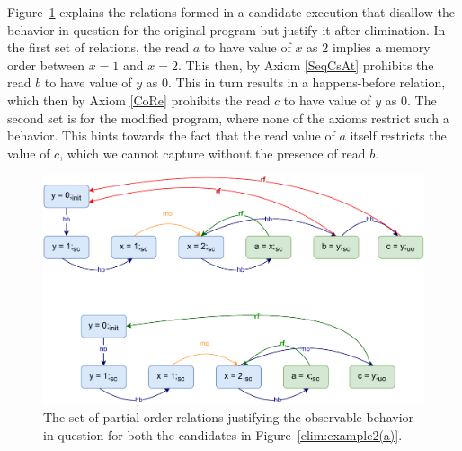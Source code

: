     Figure~\ref{elim:example2(b)} explains the relations formed in a candidate execution that disallow the behavior in question for the original program but justify it after elimination. 
    In the first set of relations, the read $a$ to have value of $x$ as $2$ implies a memory order between $x=1$ and $x=2$. 
    This then, by Axiom \ref{SeqCsAt} prohibits the read $b$ to have value of $y$ as $0$.
    This in turn results in a happens-before relation, which then by Axiom \ref{CoRe} prohibits the read $c$ to have value of $y$ as $0$.
    The second set is for the modified program, where none of the axioms restrict such a behavior\footnotemark. 
    This hints towards the fact that the read value of $a$ itself restricts the value of $c$, which we cannot capture without the presence of read $b$.
    \begin{figure}[H]
        \centering
        \includegraphics[scale=0.7]{6.Elimination/EliminationExample2(b).pdf}
        \caption{The set of partial order relations justifying the observable behavior in question for both the candidates in Figure~\ref{elim:example2(a)}.} 
        \label{elim:example2(b)}
    \end{figure}
    
